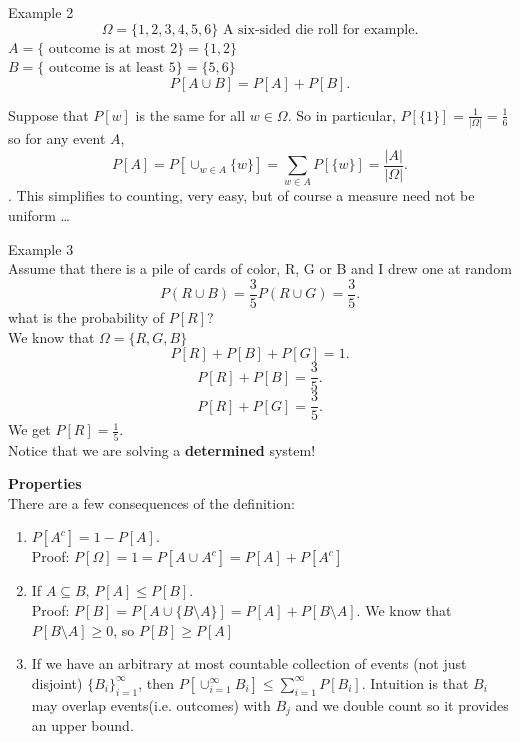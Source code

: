 \documentclass[a4paper]{article}
\begin{document}
\begin{note}{Example 2}
  \[
    \Omega = \{1,2,3,4,5,6\} \text{ A six-sided die roll for example} 
  .\] 
  $A = \{ \text{ outcome is at most 2} \} = \{1,2\}$ \\
  $B = \{ \text{ outcome is at least 5} \} = \{5,6\}$
  \[
    P[A \cup B] = P[A] + P[B]
  .\] 
\end{note}

\begin{remark}
  Suppose that $P[w]$ is the same for all $w \in \Omega$. So in particular, $P[\{1\}] = \frac{1}{|\Omega|} = \frac{1}{6}$
  so for any event $A$,
  \[
    P[A] = P[\cup_{w \in A} \{w\}] = \sum_{w \in A} P[\{w\}] = \frac{|A|}{|\Omega|}  
  .\]. This simplifies to counting, very easy, but of course a measure need not be uniform \ldots
\end{remark}

\begin{note}{Example 3}
  \\
  Assume that there is a pile of cards of color, R, G or B and I drew one at random
  \[
    P(R \cup B) = \frac{3}{5}
    P(R \cup G) = \frac{3}{5}
  .\] 
  what is the probability of $P[R]$? \\
  We know that $\Omega = \{R,G,B\}$
  \[
    P[R] + P[B] + P[G] = 1
  .\] 
  \[
    P[R] + P[B] = \frac{3}{5}
  .\] 
  \[
  P[R] + P[G] = \frac{3}{5}
  .\] 
  We get $P[R] = \frac{1}{5}$. \\

  Notice that we are solving a \textbf{determined} system!
\end{note}

\textbf{Properties}\\
There are a few consequences of the definition: 
\begin{enumerate}
  \item $P[A^c] = 1 - P[A]$. \\ Proof:  $P[\Omega] = 1 = P[A \cup A^c] = P[A] + P[A^c]$
  \item If $A \subseteq B$, $P[A] \leq P[B]$.  \\ Proof: $P[B] = P[A \cup \{B \setminus A \}] = P[A] + P[B \setminus A]$. 
    We know that $P[B \setminus A] \geq 0$, so $P[B] \geq P[A]$
  \item If we have an arbitrary at most countable collection of events (not just disjoint) $\{ B_i \}_{i=1}^\infty$, then
    $P[\cup_{i=1}^\infty B_i] \leq \sum_{i=1}^\infty P[B_i]$. Intuition is that $B_i$ may overlap events(i.e. outcomes) with $B_j$ and we double count
    so it provides an upper bound.
\end{enumerate}
\end{document}
